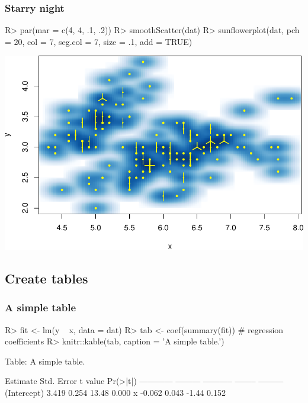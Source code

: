 \documentclass[
]{jss}
\begin{document}
\hypertarget{starry-night}{%
\subsubsection{Starry night}\label{starry-night}}

\begin{CodeChunk}

\begin{CodeInput}
R> par(mar = c(4, 4, .1, .2))
R> smoothScatter(dat)
R> sunflowerplot(dat, pch = 20, col = 7, seg.col = 7, size = .1, add = TRUE)
\end{CodeInput}


\begin{center}\includegraphics{2020-rstudio-conf-rmarkdown-demo_files/9/star-1} \end{center}

\end{CodeChunk}

\hypertarget{create-tables}{%
\subsection{Create tables}\label{create-tables}}

\hypertarget{a-simple-table}{%
\subsubsection{A simple table}\label{a-simple-table}}

\begin{CodeChunk}

\begin{CodeInput}
R> fit <- lm(y ~ x, data = dat)
R> tab <- coef(summary(fit))  # regression coefficients
R> knitr::kable(tab, caption = 'A simple table.')
\end{CodeInput}


Table: A simple table.

               Estimate   Std. Error   t value   Pr(>|t|)
------------  ---------  -----------  --------  ---------
(Intercept)       3.419        0.254     13.48      0.000
x                -0.062        0.043     -1.44      0.152

\end{CodeChunk}
\end{document}
